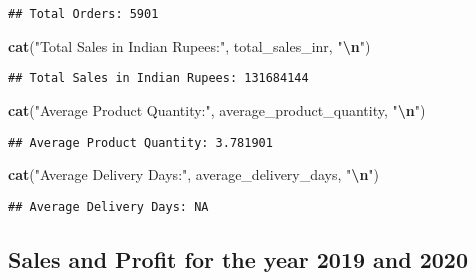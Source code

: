 \documentclass[
]{article}
\newenvironment{Shaded}{\begin{snugshade}}{\end{snugshade}}
\newcommand{\FunctionTok}[1]{\textcolor[rgb]{0.13,0.29,0.53}{\textbf{#1}}}
\newcommand{\NormalTok}[1]{#1}
\newcommand{\SpecialCharTok}[1]{\textcolor[rgb]{0.81,0.36,0.00}{\textbf{#1}}}
\newcommand{\StringTok}[1]{\textcolor[rgb]{0.31,0.60,0.02}{#1}}
\begin{document}
\begin{verbatim}
## Total Orders: 5901
\end{verbatim}

\begin{Shaded}
\begin{Highlighting}[]
\FunctionTok{cat}\NormalTok{(}\StringTok{"Total Sales in Indian Rupees:"}\NormalTok{, total\_sales\_inr, }\StringTok{"}\SpecialCharTok{\textbackslash{}n}\StringTok{"}\NormalTok{)}
\end{Highlighting}
\end{Shaded}

\begin{verbatim}
## Total Sales in Indian Rupees: 131684144
\end{verbatim}

\begin{Shaded}
\begin{Highlighting}[]
\FunctionTok{cat}\NormalTok{(}\StringTok{"Average Product Quantity:"}\NormalTok{, average\_product\_quantity, }\StringTok{"}\SpecialCharTok{\textbackslash{}n}\StringTok{"}\NormalTok{)}
\end{Highlighting}
\end{Shaded}

\begin{verbatim}
## Average Product Quantity: 3.781901
\end{verbatim}

\begin{Shaded}
\begin{Highlighting}[]
\FunctionTok{cat}\NormalTok{(}\StringTok{"Average Delivery Days:"}\NormalTok{, average\_delivery\_days, }\StringTok{"}\SpecialCharTok{\textbackslash{}n}\StringTok{"}\NormalTok{)}
\end{Highlighting}
\end{Shaded}

\begin{verbatim}
## Average Delivery Days: NA
\end{verbatim}

\hypertarget{sales-and-profit-for-the-year-2019-and-2020}{%
\subsection{Sales and Profit for the year 2019 and
2020}\label{sales-and-profit-for-the-year-2019-and-2020}}
\end{document}
